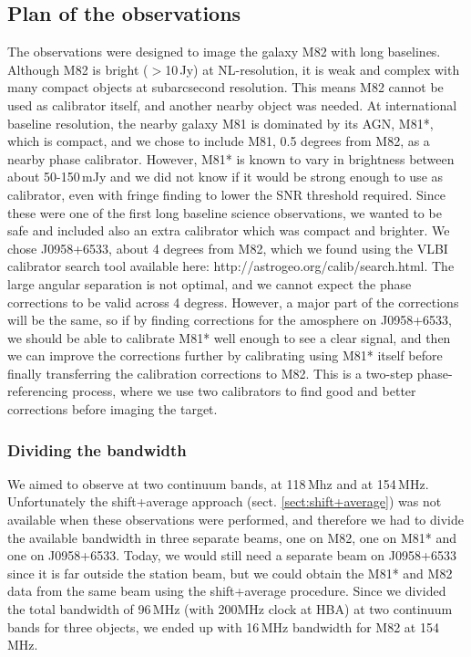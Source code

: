 \subsection{Plan of the observations}
The observations were designed to image the galaxy M82 with long baselines.
Although M82 is bright ($>$10\,Jy) at NL-resolution, it is weak and complex
with many compact objects at subarcsecond resolution. This means M82
cannot be used as calibrator itself, and another nearby object was needed.
At international baseline resolution, the nearby galaxy M81 is dominated by 
its AGN, M81*, which is compact, and we chose to include M81, 
0.5 degrees from M82, as a nearby phase calibrator. However,
M81* is known to vary in brightness between about 50-150\,mJy
and we did not know if it would be strong enough to use as calibrator,
even with fringe finding to lower the SNR threshold required. Since
these were one of the first long baseline science observations, we
wanted to be safe and included also an extra calibrator which was compact and
brighter. We chose J0958+6533, about 4 degrees from M82, which we found using the
VLBI calibrator search tool available here: http://astrogeo.org/calib/search.html.
The large angular separation is not optimal, and we cannot expect the phase
corrections to be valid across 4 degress. However, a major part of the
corrections will be the same, so if by finding corrections for the amosphere on
J0958+6533, we should be able to calibrate M81* well enough to see a clear
signal, and then we can improve the corrections further by calibrating using
M81* itself before finally transferring the calibration corrections to M82.
This is a two-step phase-referencing process, where we use two calibrators to
find good and better corrections before imaging the target. 

\subsubsection{Dividing the bandwidth}
We aimed to observe at two continuum bands, at 118\,Mhz and at 154\,MHz.
Unfortunately the shift+average approach (sect. \ref{sect:shift+average}) was not
available when these observations were performed, and therefore we 
had to divide the available bandwidth in three separate beams, one on M82, one
on M81* and one on J0958+6533. Today, we would still need a separate beam
on J0958+6533 since it is far outside the station beam, but we could obtain
the M81* and M82 data from the same beam using the shift+average procedure.
Since we divided the total bandwidth of 96\,MHz (with 200MHz clock at HBA) 
at two continuum bands for three objects, 
we ended up with 16\,MHz bandwidth for M82 at 154\,MHz. 

